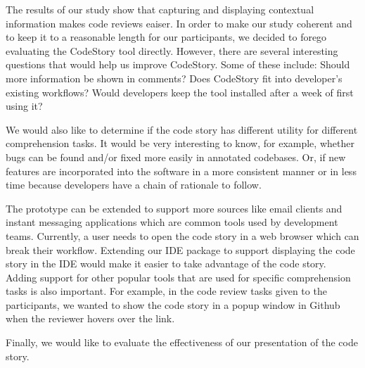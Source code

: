 \documentclass[../manifest.tex]{subfiles}
\begin{document}
The results of our study show that capturing and displaying contextual information makes code reviews eaiser. In order to make our study coherent and to keep it to a reasonable length for our participants, we decided to forego evaluating the  CodeStory tool directly. However, there are several interesting questions that would help us improve CodeStory. Some of these include: Should more information be shown in comments? Does CodeStory fit into developer's existing workflows? Would developers keep the tool installed after a week of first using it?

We would also like to determine if the code story has different utility for different comprehension tasks. It would be very interesting to know, for example, whether bugs can be found and/or fixed more easily in annotated codebases. Or, if new features are incorporated into the software in a more consistent manner or in less time because developers have a chain of rationale to follow.

The prototype can be extended to support more sources like email clients and instant messaging applications which are common tools used by development teams. Currently, a user needs to open the code story in a web browser which can break their workflow. Extending our IDE package to support displaying the code story in the IDE would make it easier to take advantage of the code story. Adding support for other popular tools that are used for specific comprehension tasks is also important. For example, in the code review tasks given to the participants, we wanted to show the code story in a popup window in Github when the reviewer hovers over the link.

Finally, we would like to evaluate the effectiveness of our presentation of the code story.
\end{document}
